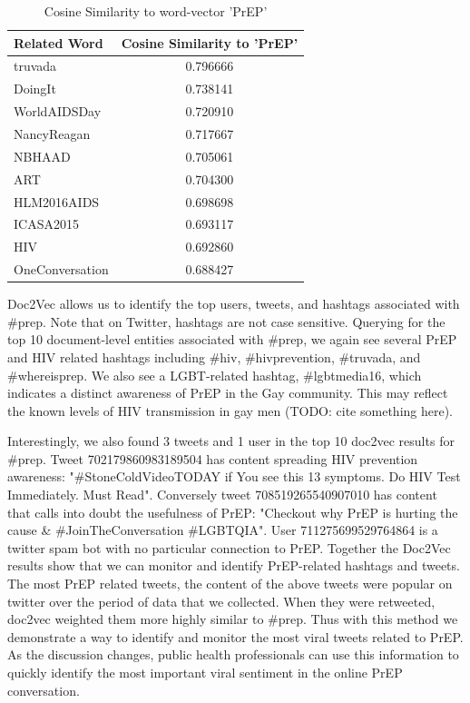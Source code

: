 \documentclass{sig-alternate-05-2015}
\begin{document}
\begin{table}
\centering
\caption{Cosine Similarity to word-vector 'PrEP'}
\begin{tabular}{|l|c|} \hline
Related Word & Cosine Similarity to 'PrEP'\\ \hline
truvada & 0.796666\\ \hline
DoingIt & 0.738141\\ \hline
WorldAIDSDay & 0.720910\\ \hline
NancyReagan & 0.717667\\ \hline
NBHAAD & 0.705061\\ \hline
ART & 0.704300\\ \hline
HLM2016AIDS & 0.698698\\ \hline
ICASA2015 & 0.693117\\ \hline
HIV & 0.692860\\ \hline
OneConversation & 0.688427\\ \hline
\hline\end{tabular}
\end{table}

Doc2Vec allows us to identify the top users, tweets, and hashtags associated with \#prep. Note that on Twitter, hashtags are not case sensitive. Querying for the top 10 document-level entities associated with \#prep, we again see several PrEP and HIV related hashtags including \#hiv, \#hivprevention, \#truvada, and \#whereisprep. We also see a LGBT-related hashtag, \#lgbtmedia16, which indicates a distinct awareness of PrEP in the Gay community. This may reflect the known levels of HIV transmission in gay men (TODO: cite something here).

Interestingly, we also found 3 tweets and 1 user in the top 10 doc2vec results for \#prep. Tweet 702179860983189504 has content spreading HIV prevention awareness: "\#StoneColdVideoTODAY if You see this 13 symptoms. Do HIV Test Immediately. Must Read". Conversely tweet 708519265540907010 has content that calls into doubt the usefulness of PrEP: "Checkout why PrEP is hurting the cause \& \#JoinTheConversation \#LGBTQIA". User 711275699529764864 is a twitter spam bot with no particular connection to PrEP. Together the Doc2Vec results show that we can monitor and identify PrEP-related hashtags and tweets. The most PrEP related tweets, the content of the above tweets were popular on twitter over the period of data that we collected. When they were retweeted, doc2vec weighted them more highly similar to \#prep. Thus with this method we demonstrate a way to identify and monitor the most viral tweets related to PrEP. As the discussion changes, public health professionals can use this information to quickly identify the most important viral sentiment in the online PrEP conversation.
\end{document}
